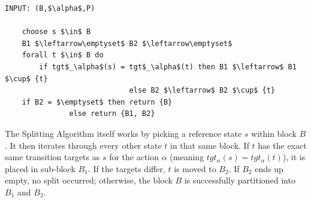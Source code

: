 \begin{lstlisting}[mathescape, caption={Split algorithm.}, captionpos=b]
    INPUT: (B,$\alpha$,P)
    
    choose s $\in$ B
    B1 $\leftarrow\emptyset$ B2 $\leftarrow\emptyset$
    forall t $\in$ B do
        if tgt$_\alpha$(s) = tgt$_\alpha$(t) then B1 $\leftarrow$ B1 $\cup$ {t}
                             else B2 $\leftarrow$ B2 $\cup$ {t}
    if B2 = $\emptyset$ then return {B}
               else return {B1, B2}
\end{lstlisting}

The Splitting Algorithm itself works by picking a reference state $s$ within block $B$. It then iterates through every other state $t$ in that same block. If $t$ has the exact same transition targets as $s$ for the action $\alpha$ (meaning $tgt_{\alpha}(s) = tgt_{\alpha}(t)$), it is placed in sub-block $B_1$. If the targets differ, $t$ is moved to $B_2$. If $B_2$ ends up empty, no split occurred; otherwise, the block $B$ is successfully partitioned into $B_1$ and $B_2$.  


